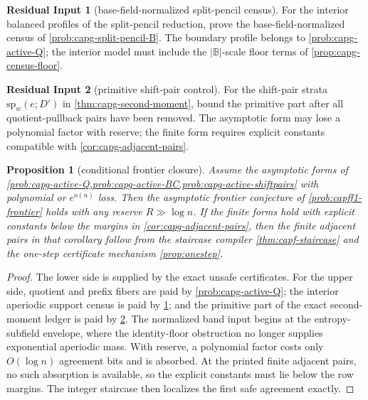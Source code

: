 \documentclass[11pt]{article}
\newtheorem{proposition}[proposition]{Proposition}
\theoremstyle{definition}
\newtheorem{residualinput}[residualinput]{Residual Input}
\theoremstyle{remark}
\begin{document}
\begin{residualinput}[base-field-normalized split-pencil census]\label{prob:capg-active-BC}
For the interior balanced profiles of the split-pencil reduction, prove the
base-field-normalized census of \cref{prob:capg-split-pencil-B}.  The boundary
profile belongs to \cref{prob:capg-active-Q}; the interior model must include
the \(|\mathbb B|\)-scale floor terms of \cref{prop:capg-census-floor}.
\end{residualinput}

\begin{residualinput}[primitive shift-pair control]\label{prob:capg-active-shiftpairs}
For the shift-pair strata \(\mathrm{sp}_w(e;D')\) in
\cref{thm:capg-second-moment}, bound the primitive part after all
quotient-pullback pairs have been removed.  The asymptotic form may lose a
polynomial factor with reserve; the finite form requires explicit constants
compatible with \cref{cor:capg-adjacent-pairs}.
\end{residualinput}

\begin{proposition}[conditional frontier closure]\label{prop:capg-final-active-package}
Assume the asymptotic forms of
\cref{prob:capg-active-Q,prob:capg-active-BC,prob:capg-active-shiftpairs} with
polynomial or \(e^{o(n)}\) loss.  Then the asymptotic frontier conjecture of
\cref{prob:capff1-frontier} holds with any reserve \(R\gg\log n\).  If the
finite forms hold with explicit constants below the margins in
\cref{cor:capg-adjacent-pairs}, then the finite adjacent pairs in that
corollary follow from the staircase compiler \cref{thm:capf-staircase} and the
one-step certificate mechanism \cref{prop:onestep}.
\end{proposition}

\begin{proof}
The lower side is supplied by the exact unsafe certificates.  For the upper
side, quotient and prefix fibers are paid by \cref{prob:capg-active-Q}; the
interior aperiodic support census is paid by
\cref{prob:capg-active-BC}; and the primitive part of the exact second-moment
ledger is paid by \cref{prob:capg-active-shiftpairs}.  The normalized band
input begins at the entropy-subfield envelope, where the identity-floor
obstruction no longer supplies exponential aperiodic mass.  With reserve, a
polynomial factor costs only \(O(\log n)\) agreement bits and is absorbed.  At
the printed finite adjacent pairs, no such absorption is available, so the
explicit constants must lie below the row margins.  The integer staircase then
localizes the first safe agreement exactly.
\end{proof}
\end{document}
